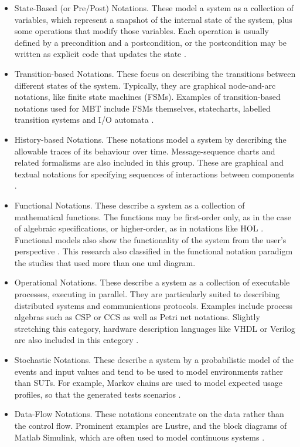 \documentclass[espaco=umemeio,chapter=TITLE,twoside,openright]{abnt}
\begin{document}
\begin{itemize}
\item State-Based (or Pre/Post) Notations. These model a system as a collection of variables, which represent a snapshot of the internal state of the system, plus some operations that modify those variables. Each operation is usually defined by a precondition and a postcondition, or the postcondition may be written as explicit code that updates the state \cite{MarkUtting2012}.
\item Transition-based Notations. These focus on describing the transitions between different states
of the system. Typically, they are graphical node-and-arc notations, like finite state machines
(FSMs). Examples of transition-based notations used for MBT include FSMs themselves, statecharts, labelled transition systems and I/O automata \cite{MarkUtting2012}.
\item History-based Notations. These notations model a system by describing the allowable traces
of its behaviour over time. Message-sequence charts and related formalisms are also included in this group. These are
graphical and textual notations for specifying sequences of interactions between components \cite{MarkUtting2012}.
\item Functional Notations. These describe a system as a collection of mathematical functions. The
functions may be first-order only, as in the case of algebraic specifications, or higher-order, as in
notations like HOL \cite{MarkUtting2012}. Functional models also show the functionality of the system from the user’s perspective \cite{Ye2007}. This research also classified in the  functional notation paradigm the studies that used more than one uml diagram. 
\item Operational Notations. These describe a system as a collection of executable processes,
executing in parallel. They are particularly suited to describing distributed systems and
communications protocols. Examples include process algebras such as CSP or CCS as well as
Petri net notations. Slightly stretching this category, hardware description languages like VHDL
or Verilog are also included in this category \cite{MarkUtting2012}.
\item Stochastic Notations. These describe a system by a probabilistic model of the events and input
values and tend to be used to model environments rather than SUTs. For example, Markov chains
are used to model expected usage profiles, so that the generated tests scenarios \cite{MarkUtting2012}.
\item Data-Flow Notations. These notations concentrate on the data rather than the control flow.
Prominent examples are Lustre, and the block diagrams of Matlab Simulink, which are often used
to model continuous systems \cite{MarkUtting2012}.
\end{itemize}
\end{document}
